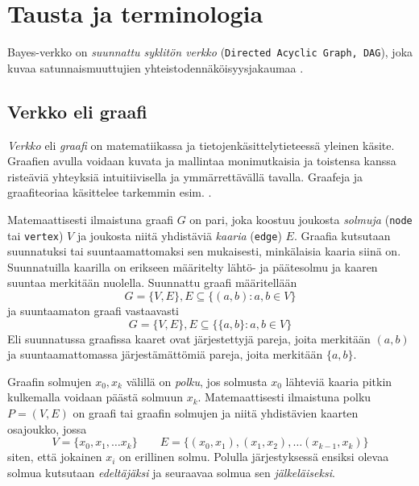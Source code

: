 \chapter{Tausta ja terminologia\label{background}} 

Bayes-verkko on \emph{suunnattu syklitön verkko} (\texttt{Directed Acyclic Graph, DAG}), joka kuvaa satunnaismuuttujien yhteistodennäköisyysjakaumaa \citep{ruggeri_bayesian_2008}. 

\section{Verkko eli graafi} 

\emph{Verkko} eli \emph{graafi} on matematiikassa ja tietojenkäsittelytieteessä yleinen käsite. Graafien avulla voidaan kuvata ja mallintaa monimutkaisia ja toistensa kanssa risteäviä yhteyksiä intuitiivisella ja ymmärrettävällä tavalla. Graafeja ja graafiteoriaa käsittelee tarkemmin esim. \citet{diestel_graph_2017}. 

\begin{center} 
\centering 
\begin{minipage}{.5\textwidth} 
  \centering 
\end{minipage}%
\begin{minipage}{.5\textwidth} 
  \centering 
\end{minipage} 
\end{center} 

Matemaattisesti ilmaistuna graafi $G$ on pari, joka koostuu joukosta \emph{solmuja} (\texttt{node} tai \texttt{vertex}) $V$ ja joukosta niitä yhdistäviä \emph{kaaria} (\texttt{edge}) $E$. Graafia kutsutaan suunnatuksi tai suuntaamattomaksi sen mukaisesti, minkälaisia kaaria siinä on. Suunnatuilla kaarilla on erikseen määritelty lähtö- ja päätesolmu ja kaaren suuntaa merkitään nuolella. Suunnattu graafi määritellään  
$$ 
    G = \{V, E\}, E \subseteq \{(a,b) : a,b \in V \} 
$$ 
ja suuntaamaton graafi vastaavasti 
$$ 
    G = \{V, E\}, E \subseteq \{\{a,b\} : a,b \in V \} 
$$ 
Eli suunnatussa graafissa kaaret ovat järjestettyjä pareja, joita merkitään $(a,b)$ ja suuntaamattomassa järjestämättömiä pareja, joita merkitään $\{a,b\}$. 

Graafin solmujen $x_0, x_k$ välillä on \emph{polku}, jos solmusta $x_0$ lähteviä kaaria pitkin kulkemalla voidaan päästä solmuun $x_k$. Matemaattisesti ilmaistuna polku $P=(V,E)$ on graafi tai graafin solmujen ja niitä yhdistävien kaarten osajoukko, jossa  
$$ 
    V = \{x_0, x_1, \ldots x_k \} \qquad E = \{(x_0, x_1), (x_1,x_2),\ldots(x_{k-1}, x_k)\} 
$$  
siten, että jokainen $x_i$ on erillinen solmu. Polulla järjestyksessä ensiksi olevaa solmua kutsutaan \emph{edeltäjäksi} ja seuraavaa solmua sen \emph{jälkeläiseksi}. 

